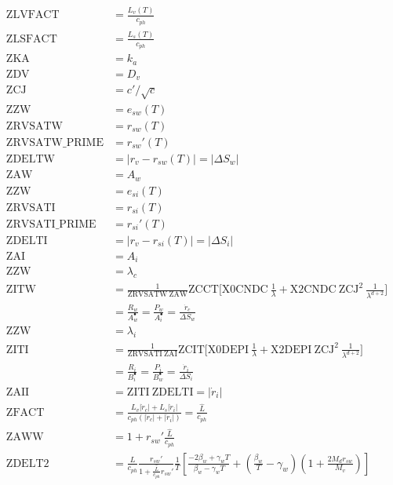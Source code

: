 \begingroup
\allowdisplaybreaks
\begin{align}
 \mathrm{ZLVFACT} &= \frac{L_v(T)}{c_{ph}} \\
 \mathrm{ZLSFACT} &= \frac{L_s(T)}{c_{ph}} \\
 \mathrm{ZKA} &= k_a \\
 \mathrm{ZDV} &= D_v \\
 \mathrm{ZCJ} &= c'/\sqrt c \\
 \mathrm{ZZW} &= e_{sw}(T) \\
 \mathrm{ZRVSATW} &= r_{sw}(T) \\
 \mathrm{ZRVSATW\_PRIME} &= r_{sw}'(T) \\
 \mathrm{ZDELTW} &= |r_v - r_{sw}(T)| = |\Delta S_w| \\
 \mathrm{ZAW} &= A_w \\
 \mathrm{ZZW} &= e_{si}(T) \\
 \mathrm{ZRVSATI} &= r_{si}(T) \\
 \mathrm{ZRVSATI\_PRIME} &= r_{si}'(T) \\
 \mathrm{ZDELTI} &= |r_v - r_{si}(T)| = |\Delta S_i| \\
 \mathrm{ZAI} &= A_i \\
 \mathrm{ZZW} &= \lambda_c \\
 \mathrm{ZITW} &= \frac{1}{\mathrm{ZRVSATW} ~ \mathrm{ZAW}} \mathrm{ZCCT} \bigg[\mathrm{X0CNDC} ~ \frac{1}{\lambda} + \mathrm{X2CNDC} ~ \mathrm{ZCJ}^2 ~ \frac{1}{\lambda^{d+2}}\bigg]  \\ 
 &= \frac{R_w}{A_w^\bullet} = \frac{P_w}{A_i^\bullet} = \frac{\dot{r}_c}{\Delta S_w} \\
 \mathrm{ZZW} &= \lambda_i \\
 \mathrm{ZITI} &= \frac{1}{\mathrm{ZRVSATI} ~ \mathrm{ZAI}} \mathrm{ZCIT} \bigg[\mathrm{X0DEPI} ~ \frac{1}{\lambda} + \mathrm{X2DEPI} ~ \mathrm{ZCJ}^2 ~ \frac{1}{\lambda^{d+2}}\bigg]  \\ 
 &= \frac{R_i}{B_i^\bullet} = \frac{P_i}{B_w^\bullet} = \frac{\dot{r}_i}{\Delta S_i} \\
 \mathrm{ZAII} &= \mathrm{ZITI} ~ \mathrm{ZDELTI} = |\dot{r}_i| \\
 \mathrm{ZFACT} &= \frac{L_v |\dot{r}_c| + L_s |\dot{r}_i|}{c_{ph} (|\dot{r}_c| + |\dot{r}_i|)} = \frac{\hat{L}}{c_{ph}} \\
 \mathrm{ZAWW} &= 1 + r_{sw}' \frac{\hat{L}}{c_{ph}} \\
 \mathrm{ZDELT2} &= \frac{\hat{L}}{c_{ph}} \frac{r_{sw}'}{1 + \frac{\hat{L}}{c_{ph}} r_{sw}'} \frac{1}{T} \left[ \frac{-2 \beta_w + \gamma_w T}{\beta_w - \gamma_w T} + \left( \frac{\beta_w}{T} - \gamma_w \right) \left( 1 + \frac{2 M_d r_{sw}}{M_v} \right)\right] \\

\end{align}
